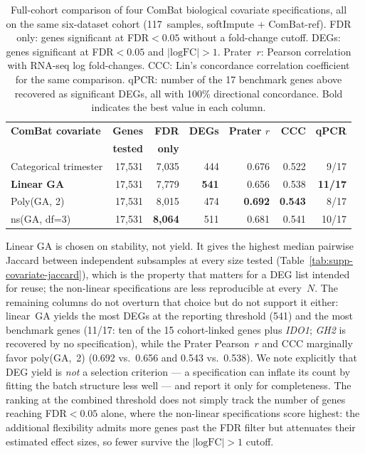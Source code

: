 \documentclass[11pt,a4paper]{article}
\begin{document}
\begin{table}[htbp]
\centering
\footnotesize
\begin{tabular}{@{}lrrrrrr@{}}
\toprule
\textbf{ComBat covariate} & \textbf{Genes} &
  \textbf{FDR} & \textbf{DEGs} & \textbf{Prater $r$} &
  \textbf{CCC} & \textbf{qPCR} \\
  & \textbf{tested} & \textbf{only} & & & & \\
\midrule
Categorical trimester & 17{,}531 & 7{,}035 & 444 & 0.676 & 0.522 & 9/17 \\
\textbf{Linear GA}    & 17{,}531 & 7{,}779 & \textbf{541} & 0.656 & 0.538 & \textbf{11/17} \\
Poly(GA, 2)           & 17{,}531 & 8{,}015 & 474 & \textbf{0.692} & \textbf{0.543} & 8/17 \\
ns(GA, df=3)          & 17{,}531 & \textbf{8{,}064} & 511 & 0.681 & 0.541 & 10/17 \\
\bottomrule
\end{tabular}
\caption{Full-cohort comparison of four ComBat biological covariate
  specifications, all on the same six-dataset cohort
  (117~samples, softImpute + ComBat-ref). FDR only: genes
  significant at FDR${}<0.05$ without a fold-change cutoff.
  DEGs: genes significant at FDR${}<0.05$ and
  $|\text{logFC}|>1$. Prater~$r$: Pearson correlation with
  \citet{Prater2021} RNA-seq log fold-changes. CCC: Lin's
  concordance correlation coefficient for the same comparison.
  qPCR: number of the 17 benchmark genes above recovered as
  significant DEGs, all with 100\% directional concordance.
  Bold indicates the best value in each column.}
\label{tab:supp-covariate}
\end{table}

Linear GA is chosen on stability, not yield. It gives the
highest median pairwise Jaccard between independent subsamples
at every size tested (Table~\ref{tab:supp-covariate-jaccard}),
which is the property that matters for a DEG list intended for
reuse; the non-linear specifications are less reproducible at
every~$N$. The remaining columns do not overturn that choice but
do not support it either: linear~GA yields the most DEGs at the
reporting threshold (541) and the most benchmark genes (11/17:
ten of the 15 cohort-linked genes plus \textit{IDO1};
\textit{GH2} is recovered by no specification),
while the Prater Pearson~$r$ and CCC marginally favor
poly(GA,~2) (0.692 vs.\ 0.656 and 0.543 vs.\ 0.538). We note
explicitly that DEG yield is \emph{not} a selection criterion
--- a specification can inflate its count by fitting the batch
structure less well --- and report it only for completeness. The ranking at the combined
threshold does not simply track the number of genes reaching
FDR${}<0.05$ alone, where the non-linear specifications score
highest: the additional flexibility admits more genes past the
FDR filter but attenuates their estimated effect sizes, so fewer
survive the $|\text{logFC}|>1$ cutoff.
\end{document}
